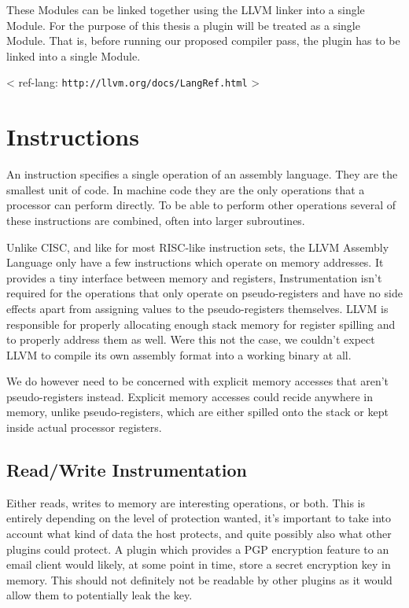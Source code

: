 These Modules can be linked together using the LLVM linker into a single Module.
For the purpose of this thesis a plugin will be treated as a single Module. That
is, before running our proposed compiler pass, the plugin has to be linked into
a single Module.

< ref-lang: \texttt{http://llvm.org/docs/LangRef.html} >


\section {Instructions}

An instruction specifies a single operation of an assembly language. They are
the smallest unit of code. In machine code they are the only operations that a
processor can perform directly. To be able to perform other operations several
of these instructions are combined, often into larger subroutines.

Unlike CISC, and like for most RISC-like instruction sets, the LLVM Assembly
Language only have a few instructions which operate on memory addresses. It
provides a tiny interface between memory and registers, Instrumentation isn't
required for the operations that only operate on pseudo-registers and have no
side effects apart from assigning values to the pseudo-registers themselves.
LLVM is responsible for properly allocating enough stack memory for register
spilling and to properly address them as well. Were this not the case, we
couldn't expect LLVM to compile its own assembly format into a working binary at
all.

We do however need to be concerned with explicit memory accesses that aren't
pseudo-registers instead. Explicit memory accesses could recide anywhere in
memory, unlike pseudo-registers, which are either spilled onto the stack or kept
inside actual processor registers.

\subsection {Read/Write Instrumentation}

Either reads, writes to memory are interesting operations, or both. This is
entirely depending on the level of protection wanted, it's important to take
into account what kind of data the host protects, and quite possibly also what
other plugins could protect. A plugin which provides a PGP encryption feature to
an email client would likely, at some point in time, store a secret encryption
key in memory. This should not definitely not be readable by other plugins as it
would allow them to potentially leak the key.


